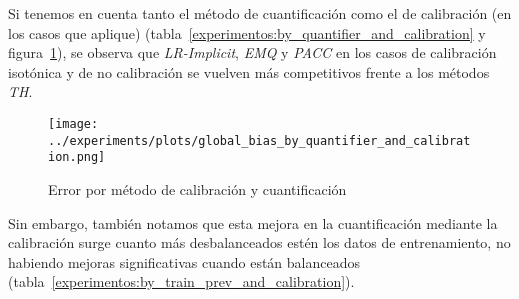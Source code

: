 Si tenemos en cuenta tanto el método de cuantificación como el de calibración
(en los casos que aplique)
(tabla~\ref{experimentos:by_quantifier_and_calibration} y
figura~\ref{fig:global_bias_by_quantifier_and_calibration}), se observa que {\it
LR-Implicit}, {\it EMQ} y {\it PACC} en los casos de calibración isotónica y de
no calibración se vuelven más competitivos frente a los métodos {\it TH}.

\begin{figure}[!tph]
    \centering
    \centerline{\texttt{[image: ../experiments/plots/global\_bias\_by\_quantifier\_and\_calibration.png]}}
    \caption{Error por método de calibración y
    cuantificación}\label{fig:global_bias_by_quantifier_and_calibration}
\end{figure}

Sin embargo, también notamos que esta mejora en la cuantificación mediante la
calibración surge cuanto más desbalanceados estén los datos de entrenamiento, no
habiendo mejoras significativas cuando están balanceados
(tabla~\ref{experimentos:by_train_prev_and_calibration}).

